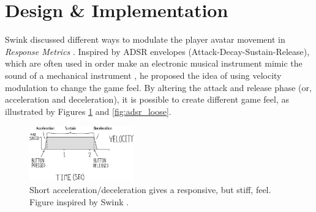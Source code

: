 \section{Design \& Implementation} \label{design}
Swink discussed different ways to modulate the player avatar movement in \textit{Response Metrics} \cite{swink}. Inspired by ADSR envelopes (Attack-Decay-Sustain-Release), which are often used in order make an electronic musical instrument mimic the sound of a mechanical instrument \cite{adsr}, he proposed the idea of using velocity modulation to change the game feel. By altering the attack and release phase (or, acceleration and deceleration), it is possible to create different game feel, as illustrated by Figures \ref{fig:adsr_stiff} and \ref{fig:adsr_loose}.






\begin{figure}[htbp]
\centering
\includegraphics[width=0.40\textwidth]{Pics/adsr_stiff}
\caption{Short acceleration/deceleration gives a responsive, but stiff, feel. Figure inspired by Swink \cite{swink}.}
\label{fig:adsr_stiff}
\end{figure}

